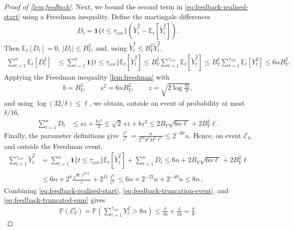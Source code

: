 \documentclass[11pt]{article}
\newcommand{\E}{\mathbb E}
\newcommand{\Pp}{\mathbb P}
\newcommand{\1}{\mathbf 1}
\newcommand{\eps}{\varepsilon}
\begin{document}
\begin{proof}[Proof of \cref{lem:feedback}]
    Next, we bound the second term in \eqref{eq:feedback-realised-start} using a Freedman inequality.
    Define the martingale differences
    \begin{align}
        D_t
        =
        \1\{t\leq\tau_{\mathrm{cov}}\}
        \left(
        \widetilde Y_t^2
        -
        \E_t[\widetilde Y_t^2]
        \right).
    \end{align}
    Then
    $\E_t[D_t]
        =0$,
    $|D_t|\leq B_Y^2$,
    and, using $\widetilde Y_t^4\leq B_Y^2\widetilde Y_t^2$,
    \begin{align}
        \sum_{t=1}^n\E_t[D_t^2]
         & \leq
        \sum_{t=1}^n
        \1\{t\leq\tau_{\mathrm{cov}}\}
        \E_t[\widetilde Y_t^4]
        \leq
        B_Y^2
        \sum_{t=1}^{\tau_{\mathrm{cov}}}
        \E_t[\widetilde Y_t^2]
        \leq
        B_Y^2
        \sum_{t=1}^{\tau_{\mathrm{cov}}}
        \E_t[Y_t^2]
        \leq
        6nB_Y^2.
        \label{eq:feedback-freedman-variance}
    \end{align}
    Applying the Freedman inequality \cref{lem:freedman} with
    \begin{align}
        b=B_Y^2,
        \qquad
        s^2=6nB_Y^2,
        \qquad
        z=\sqrt{2\log\frac{32}{\delta}},
    \end{align}
    and using $\log(32/\delta)\leq\ell$, we obtain, outside an event of
    probability at most $\delta/16$,
    \begin{align}
        \sum_{t=1}^nD_t
         & \leq
        sz+\frac{bz^2}{3}
        \leq
        \sqrt2\,s z+bz^2
        \leq
        2B_Y\sqrt{6n\ell}
        +
        2B_Y^2\ell.
        \label{eq:feedback-freedman}
    \end{align}
    Finally, the parameter definitions give
    $\frac{\ell^3}{\eps^2}
        =
        \frac{
            n
        }{
            2^{60}d^4M^2\ell^5
        }
        \leq2^{-60}n$.
    Hence, on event $\mathcal E_{\mathrm{tr}}$ and outside the Freedman event,
    \begin{align}
        \sum_{t=1}^{\tau_{\mathrm{cov}}}
        \widetilde Y_t^2
         & =
        \sum_{t=1}^n
        \1\{t\leq\tau_{\mathrm{cov}}\}
        \E_t[\widetilde Y_t^2]
        +
        \sum_{t=1}^nD_t
        \leq
        6n
        +
        2B_Y\sqrt{6n\ell}
        +
        2B_Y^2\ell
        \\
         &
        \leq
        6n
        +
        2^8\frac{\sqrt n \ell^{3/2}}{\eps}
        +
        2^{11}\frac{\ell^3}{\eps^2}
        \leq
        6n
        +2^{-22}n
        +2^{-49}n
        \leq
        8n\,,
        \label{eq:feedback-truncated-sum}
    \end{align}
    Combining
    \eqref{eq:feedback-realised-start},
    \eqref{eq:feedback-truncation-event}, and
    \eqref{eq:feedback-truncated-sum} gives
    \begin{align}
        \Pp(\mathcal E_Y^c)
        =
        \Pp\left(
        \sum_{t=1}^{\tau_{\mathrm{cov}}}Y_t^2
        >8n
        \right)
        \leq
        \frac{\delta}{16}
        +
        \frac{\delta}{16}
        =
        \frac{\delta}{8}.
    \end{align}
\end{proof}
\end{document}
